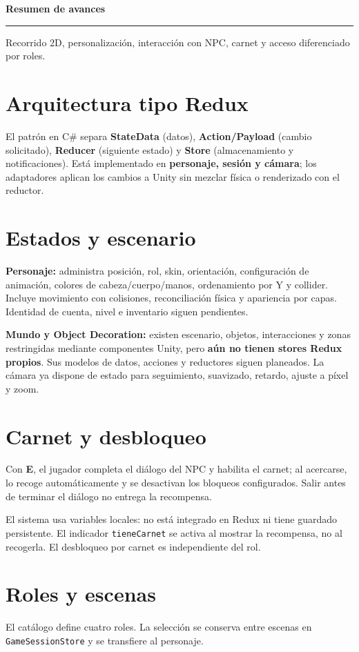 \documentclass[11pt,letterpaper]{article}
\newcommand{\code}[1]{\nolinkurl{#1}}
\begin{document}
{\Large\bfseries\color{navy} Resumen de avances\par}
{\color{teal}\rule{\textwidth}{0.8pt}}
Recorrido 2D, personalización, interacción con NPC, carnet y acceso diferenciado por roles.

\section{Arquitectura tipo Redux}
El patrón en C\# separa \textbf{StateData} (datos), \textbf{Action/Payload} (cambio solicitado), \textbf{Reducer} (siguiente estado) y \textbf{Store} (almacenamiento y notificaciones). Está implementado en \textbf{personaje, sesión y cámara}; los adaptadores aplican los cambios a Unity sin mezclar física o renderizado con el reductor.

\section{Estados y escenario}
\textbf{Personaje:} administra posición, rol, skin, orientación, configuración de animación, colores de cabeza/cuerpo/manos, ordenamiento por Y y collider. Incluye movimiento con colisiones, reconciliación física y apariencia por capas. Identidad de cuenta, nivel e inventario siguen pendientes.

\textbf{Mundo y Object Decoration:} existen escenario, objetos, interacciones y zonas restringidas mediante componentes Unity, pero \textbf{aún no tienen stores Redux propios}. Sus modelos de datos, acciones y reductores siguen planeados. La cámara ya dispone de estado para seguimiento, suavizado, retardo, ajuste a píxel y zoom.

\section{Carnet y desbloqueo}
Con \textbf{E}, el jugador completa el diálogo del NPC y habilita el carnet; al acercarse, lo recoge automáticamente y se desactivan los bloqueos configurados. Salir antes de terminar el diálogo no entrega la recompensa.

El sistema usa variables locales: no está integrado en Redux ni tiene guardado persistente. El indicador \code{tieneCarnet} se activa al mostrar la recompensa, no al recogerla. El desbloqueo por carnet es independiente del rol.

\section{Roles y escenas}
El catálogo define cuatro roles. La selección se conserva entre escenas en \code{GameSessionStore} y se transfiere al personaje.
\end{document}
